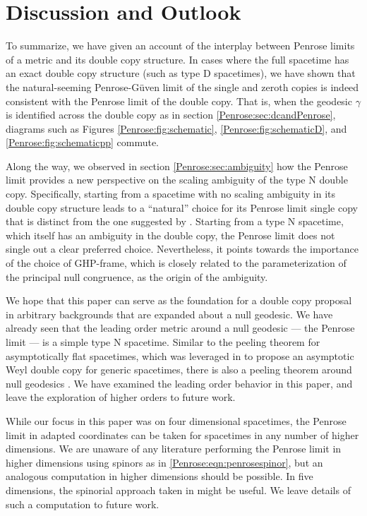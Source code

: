 \section{Discussion and Outlook}\label{Penrose:sec:discussion}

To summarize, we have given an account of the interplay between Penrose limits of a metric and its double copy
structure. In cases where the full spacetime has an exact double copy structure (such as type D spacetimes), we
have shown that the natural-seeming Penrose-Güven limit of the single and zeroth copies is indeed consistent with
the Penrose limit of the double copy. That is, when the geodesic $\gamma$ is identified across the double copy as
in section \ref{Penrose:sec:dcandPenrose}, diagrams such as Figures \ref{Penrose:fig:schematic}, \ref{Penrose:fig:schematicD}, and \ref{Penrose:fig:schematicpp} commute.

Along the way, we observed in section \ref{Penrose:sec:ambiguity} how the Penrose limit provides a new perspective on the
scaling ambiguity of the type N double copy. Specifically, starting from a spacetime with no scaling ambiguity in
its double copy structure leads to a ``natural'' choice for its Penrose limit single copy that is distinct from the
one suggested by \cite{Luna:2018dpt}. Starting from a type N spacetime, which itself has an ambiguity in the double
copy, the Penrose limit does not single out a clear preferred choice. Nevertheless, it points towards the
importance of the choice of GHP-frame, which is closely related to the parameterization of the principal null
congruence, as the origin of the ambiguity.

We hope that this paper can serve as the foundation for a double copy proposal in arbitrary backgrounds that are
expanded about a null geodesic. We have already seen that the leading order metric around a null geodesic --- the
Penrose limit --- is a simple type N spacetime. Similar to the peeling theorem \cite{newman1968new} for
asymptotically flat spacetimes, which was leveraged in \cite{Godazgar:2021iae,Adamo:2021dfg} to propose an
asymptotic Weyl double copy for generic spacetimes, there is also a peeling theorem around null geodesics
\cite{Kunze:2004qd,Blau:2006ar}. We have examined the leading order behavior in this paper, and leave the exploration of higher
orders to future work.

While our focus in this paper was on four dimensional spacetimes, the Penrose limit in adapted coordinates can be
taken for spacetimes in any number of higher dimensions. We are unaware of any literature performing the
Penrose limit in higher dimensions using spinors as in \eqref{Penrose:eqn:penrosespinor}, but an analogous computation in
higher dimensions should be possible. In five dimensions, the spinorial approach taken in
\cite{Chawla:2022ogv,Monteiro:2018xev} might be useful. We leave details of such a computation to future work.


